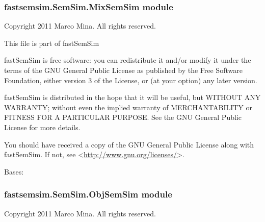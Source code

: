 \documentclass[letterpaper,10pt,english]{sphinxmanual}
\begin{document}
\subsubsection{fastsemsim.SemSim.MixSemSim module}
\label{fastsemsim.SemSim:module-fastsemsim.SemSim.MixSemSim}\label{fastsemsim.SemSim:fastsemsim-semsim-mixsemsim-module}
Copyright 2011 Marco Mina. All rights reserved.

This file is part of fastSemSim

fastSemSim is free software: you can redistribute it and/or modify
it under the terms of the GNU General Public License as published by
the Free Software Foundation, either version 3 of the License, or
(at your option) any later version.

fastSemSim is distributed in the hope that it will be useful,
but WITHOUT ANY WARRANTY; without even the implied warranty of
MERCHANTABILITY or FITNESS FOR A PARTICULAR PURPOSE.  See the
GNU General Public License for more details.

You should have received a copy of the GNU General Public License
along with fastSemSim.  If not, see \textless{}\href{http://www.gnu.org/licenses/}{http://www.gnu.org/licenses/}\textgreater{}.

\begin{fulllineitems}
\label{fastsemsim.SemSim:fastsemsim.SemSim.MixSemSim.MixSemSim}
Bases: 

\begin{fulllineitems}
\label{fastsemsim.SemSim:fastsemsim.SemSim.MixSemSim.MixSemSim.SemSim}
\end{fulllineitems}


\end{fulllineitems}



\subsubsection{fastsemsim.SemSim.ObjSemSim module}
\label{fastsemsim.SemSim:fastsemsim-semsim-objsemsim-module}\label{fastsemsim.SemSim:module-fastsemsim.SemSim.ObjSemSim}
Copyright 2011 Marco Mina. All rights reserved.
\end{document}
